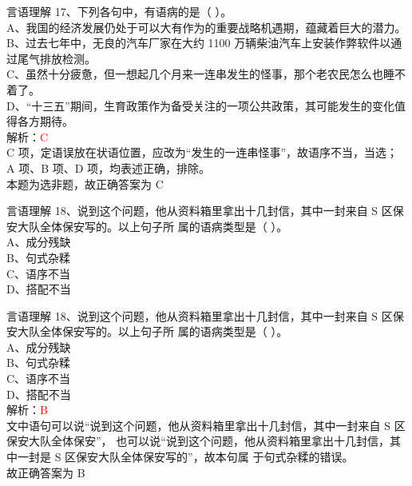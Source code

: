 \documentclass[aspectratio=169]{beamer}
\begin{document}
\begin{frame}[t]{言语理解}
    17、下列各句中，有语病的是（ ）。\\
    A、我国的经济发展仍处于可以大有作为的重要战略机遇期，蕴藏着巨大的潜力。\\
    B、过去七年中，无良的汽车厂家在大约 1100 万辆柴油汽车上安装作弊软件以通过尾气排放检测。\\
    C、虽然十分疲惫，但一想起几个月来一连串发生的怪事，那个老农民怎么也睡不着了。\\
    D、“十三五”期间，生育政策作为备受关注的一项公共政策，其可能发生的变化值得各方期待。\\

    解析：\textcolor{red}{C}\\
    C 项，定语误放在状语位置，应改为“发生的一连串怪事”，故语序不当，当选；\\
    A 项、B 项、D 项，均表述正确，排除。\\
    本题为选非题，故正确答案为 C\\
\end{frame}



\begin{frame}[t]{言语理解}
    18、说到这个问题，他从资料箱里拿出十几封信，其中一封来自 S 区保安大队全体保安写的。以上句子所
    属的语病类型是（ ）。\\
    A、成分残缺\\
    B、句式杂糅\\
    C、语序不当\\
    D、搭配不当 \\
\end{frame}


\begin{frame}[t]{言语理解}
    18、说到这个问题，他从资料箱里拿出十几封信，其中一封来自 S 区保安大队全体保安写的。以上句子所
    属的语病类型是（ ）。\\
    A、成分残缺\\
    B、句式杂糅\\
    C、语序不当\\
    D、搭配不当 \\
    解析：\textcolor{red}{B}\\
    文中语句可以说“说到这个问题，他从资料箱里拿出十几封信，其中一封来自 S 区保安大队全体保安”，
    也可以说“说到这个问题，他从资料箱里拿出十几封信，其中一封是 S 区保安大队全体保安写的”，故本句属
    于句式杂糅的错误。\\
    故正确答案为 B\\
\end{frame}
\end{document}
